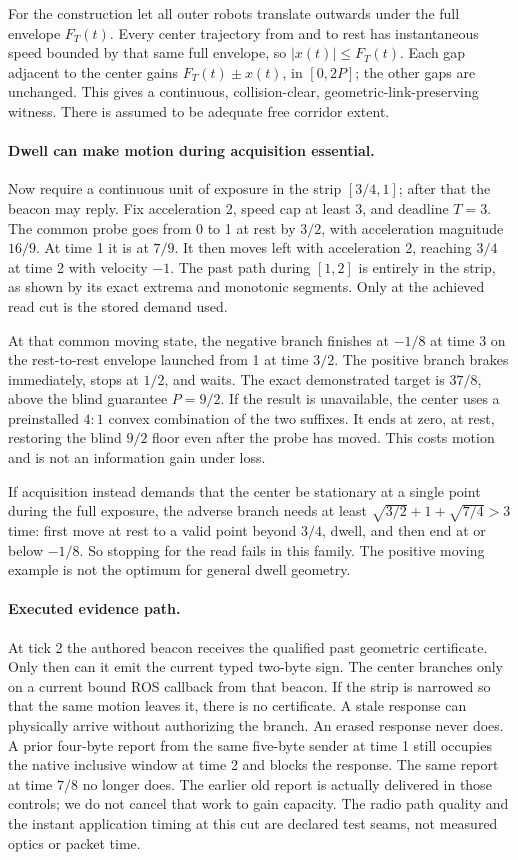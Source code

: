 \documentclass[11pt]{article}
\begin{document}
For the construction let all outer robots translate outwards
under the full envelope \(F_T(t)\). Every center trajectory from
and to rest has instantaneous speed bounded by that same full
envelope, so \(|x(t)|\le F_T(t)\). Each gap adjacent to the
center gains \(F_T(t)\pm x(t)\), in \([0,2P]\);
the other gaps are unchanged. This gives a continuous,
collision-clear, geometric-link-preserving witness. There is
assumed to be adequate free corridor extent.

\paragraph{Dwell can make motion during acquisition essential.}
Now require a continuous unit of exposure in the strip
\([3/4,1]\); after that the beacon may reply. Fix acceleration
2, speed cap at least 3, and deadline \(T=3\). The common probe
goes from 0 to 1 at rest by \(3/2\), with acceleration
magnitude \(16/9\). At time 1 it is at \(7/9\).
It then moves left with acceleration 2, reaching \(3/4\)
at time 2 with velocity \(-1\).
The past path during \([1,2]\) is entirely in the strip,
as shown by its exact extrema and monotonic segments.
Only at the achieved read cut is the stored demand used.

At that common moving state, the negative branch finishes at
\(-1/8\) at time 3 on the rest-to-rest envelope launched
from 1 at time \(3/2\). The positive branch brakes immediately,
stops at \(1/2\), and waits. The exact demonstrated target is
\(37/8\), above the blind guarantee \(P=9/2\).
If the result is unavailable, the center uses a preinstalled
\(4{:}1\) convex combination of the two suffixes. It ends at
zero, at rest, restoring the blind \(9/2\) floor even after the
probe has moved. This costs motion and is not an information
gain under loss.

If acquisition instead demands that the center be stationary
at a single point during the full exposure, the adverse branch
needs at least \(\sqrt{3/2}+1+\sqrt{7/4}>3\) time: first
move at rest to a valid point beyond \(3/4\), dwell, and then
end at or below \(-1/8\). So stopping for the read fails in
this family. The positive moving example is not the optimum
for general dwell geometry.

\paragraph{Executed evidence path.}
At tick 2 the authored beacon receives the qualified past
geometric certificate. Only then can it emit the current
typed two-byte sign. The center branches only on a current
bound ROS callback from that beacon. If the strip is narrowed
so that the same motion leaves it, there is no certificate.
A stale response can physically arrive without authorizing
the branch. An erased response never does. A prior four-byte
report from the same five-byte sender at time 1 still occupies
the native inclusive window at time 2 and blocks the response.
The same report at time \(7/8\) no longer does. The earlier
old report is actually delivered in those controls; we do not
cancel that work to gain capacity. The radio path quality and
the instant application timing at this cut are declared
test seams, not measured optics or packet time.
\end{document}
